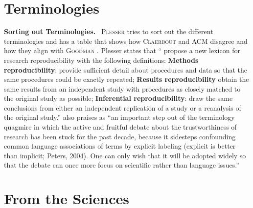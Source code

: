 \documentclass[sigconf,screen,nonacm]{acmart}
\newcommand{\mypara}[1]{\vspace{6pt}\noindent\textbf{#1}~}
\begin{document}
\section{Terminologies}



\mypara{Sorting out Terminologies.}  \textsc{Plesser}
\cite{plesser2018reproducibility} tries to sort out the different
terminologies and has a table that shows how \textsc{Claerbout}
\cite{claerbout1992electronic,schwab2000making} and \textsc{ACM}
\cite{acm2018artifact} disagree and how they align with
\textsc{Goodman} \cite{goodman2016what}. Plesser states that
``\cite{goodman2016what} propose a new lexicon for research
reproducibility with the following definitions: \textbf{Methods
  reproducibility}: provide sufficient detail about procedures and
data so that the same procedures could be exactly repeated;
\textbf{Results reproducibility} obtain the same results from an
independent study with procedures as closely matched to the original
study as possible; \textbf{Inferential reproducibility}: draw the same
conclusions from either an independent replication of a study or a
reanalysis of the original study.''  \cite{plesser2018reproducibility}
also praises \cite{goodman2016what} as ``an important step out of the
terminology quagmire in which the active and fruitful debate about the
trustworthiness of research has been stuck for the past decade,
because it sidesteps confounding common language associations of terms
by explicit labeling (explicit is better than implicit; Peters,
2004). One can only wish that it will be adopted widely so that the
debate can once more focus on scientific rather than language
issues.''

\section{From the Sciences}
\end{document}
